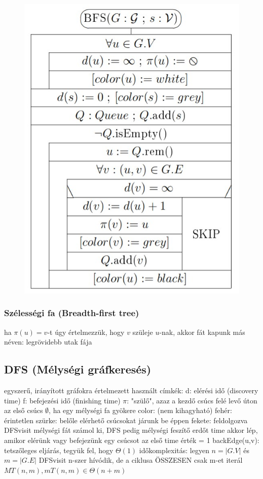 \documentclass[12pt,a4paper]{article}
\begin{document}
\pagebreak

\begin{figure}[h!]
	\centering
	\includegraphics[width=0.5\linewidth]{bfs}
\end{figure}

\subsubsection{Szélességi fa (Breadth-first tree)}

\begin{outline}
	\1 ha $\pi(u)=v$-t úgy értelmezzük, hogy $v$ szüleje $u$-nak, akkor fát kapunk
	\1 más néven: legrövidebb utak fája
\end{outline}

\pagebreak

\subsection{DFS (Mélységi gráfkeresés)}

\begin{outline}
	\1 egyszerű, irányított gráfokra értelmezett
	\1 használt címkék:
		\2 d: elérési idő (discovery time)
		\2 f: befejezési idő (finishing time)
		\2 $\pi$: "szülő", azaz a kezdő csúcs felé levő úton az első csúcs
			\3 $\emptyset$, ha egy mélységi fa gyökere
		\2 color: (nem kihagyható)
			\3 fehér: érintetlen
			\3 szürke: belőle elérhető csúcsokat járunk be éppen
			\3 fekete: feldolgozva
	\1 DFSvisit mélységi fát számol ki, DFS pedig mélységi feszítő erdőt
	\1 time akkor lép, amikor elérünk vagy befejezünk egy csúcsot
		\2 az első time érték = 1
	\1 backEdge(u,v): tetszőleges eljárás, tegyük fel, hogy $\Theta(1)$
	\1 időkomplexitás:
		\2 legyen $n=|G.V|$ és $m=|G.E|$
		\2 DFSvisit n-szer hívódik, de a ciklusa ÖSSZESEN csak m-et iterál
		\2 $MT(n,m),mT(n,m) \in \Theta(n+m)$
\end{outline}
\end{document}
